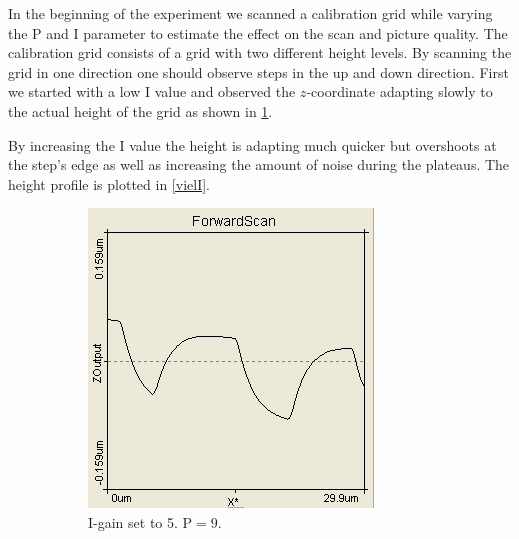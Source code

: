 \documentclass[paper=a4,fontsize=10pt,DIV=18,twocolumn,parskip=half]{scrartcl}
\numberwithin{equation}{section}    %
\begin{document}
In the beginning of the experiment we scanned a calibration grid while varying 
the P and I parameter to estimate the effect on the scan and picture quality.  
The calibration grid consists of a grid with two different height levels. By 
scanning the grid in one direction one should observe steps in the up and down 
direction. First we started with a low I value and observed the $z$-coordinate 
adapting slowly to the actual height of the grid as shown in \ref{wenigI}.

By increasing the I value the height is adapting much quicker but overshoots at 
the step's edge as well as increasing the amount of noise during the plateaus. 
The height profile is plotted in \ref{vielI}.

\begin{figure}
    \centering
    \begin{subfigure}{0.45\columnwidth}
         \includegraphics[width=\textwidth]{Bilder/wenigI}
        \caption{I-gain set to 5. $\mathrm{P}=9$. }
        \label{wenigI}
    \end{subfigure}
    ~
    \begin{subfigure}{0.45\columnwidth}

\end{subfigure}
\end{figure}
\end{document}
